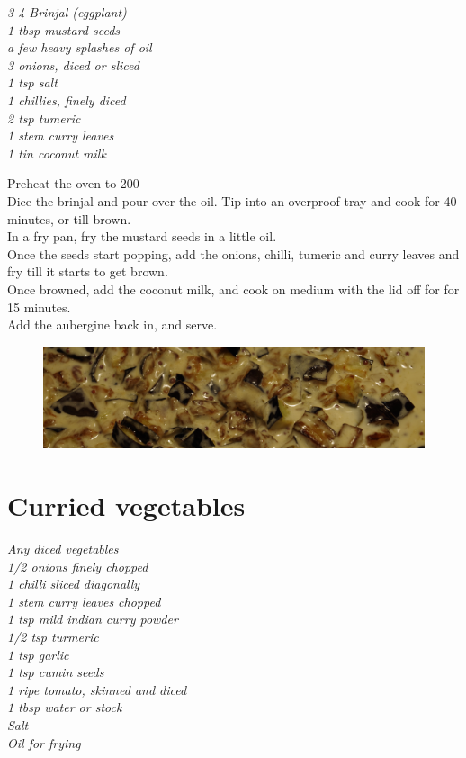 \documentclass{tufte-book}
\begin{document}
\smallskip
\emph{3-4 Brinjal (eggplant)
\\1 tbsp mustard seeds
\\a few heavy splashes of oil
\\3 onions, diced or sliced
\\1 tsp salt
\\1 chillies, finely diced
\\2 tsp tumeric
\\1 stem curry leaves
\\1 tin coconut milk}

\smallskip
Preheat the oven to 200\celsius 
\\Dice the brinjal and pour over the oil. Tip into an overproof tray and cook for 40 minutes, or till brown.
\\In a fry pan, fry the mustard seeds in a little oil.
\\Once the seeds start popping, add the onions, chilli, tumeric and curry leaves and fry till it starts to get brown.
\\Once browned, add the coconut milk, and cook on medium with the lid off for for 15 minutes.  
\\Add the aubergine back in, and serve.

\begin{figure}
  \includegraphics{eggplantcurry.png}
\end{figure}


\section{Curried vegetables}

\emph{Any diced vegetables
\\1/2 onions finely chopped
\\1 chilli sliced diagonally
\\1 stem curry leaves chopped
\\1 tsp mild indian curry powder
\\1/2 tsp turmeric
\\1 tsp garlic
\\1 tsp cumin seeds
\\1 ripe tomato, skinned and diced
\\1 tbsp water or stock
\\Salt
\\Oil for frying}
\end{document}
